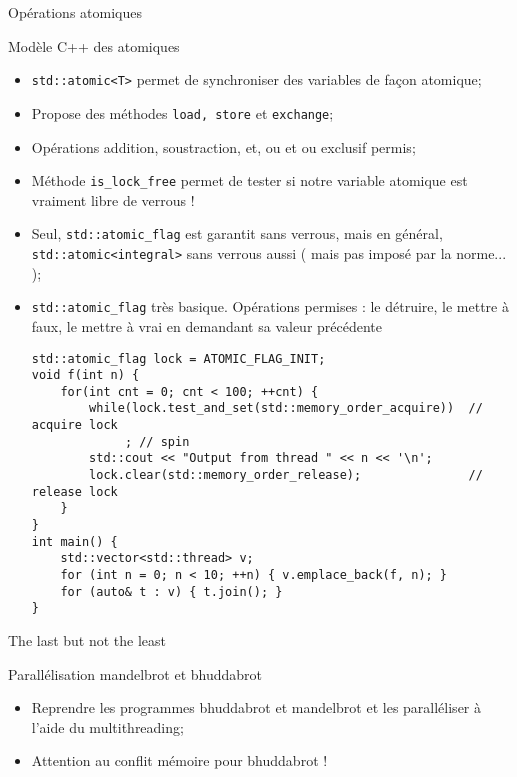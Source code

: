 \documentclass[handout,10pt]{beamer}
\begin{document}
\begin{frame}[fragile]{Opérations atomiques}
 \tiny
 \begin{block}{Modèle C++ des atomiques}
  \begin{itemize}
   \item \lstinline$std::atomic<T>$  permet de synchroniser des variables de façon atomique;
   \item Propose des méthodes \lstinline$load, store$ et \lstinline$exchange$;
   \item Opérations addition, soustraction, et, ou et ou exclusif permis;
   \item Méthode \lstinline$is_lock_free$ permet de tester si notre variable atomique est vraiment libre de verrous !
   \item Seul, \lstinline$std::atomic_flag$ est garantit sans verrous, mais en général, \lstinline$std::atomic<integral>$ sans verrous aussi ( mais pas imposé par la norme... );
   \item \lstinline$std::atomic_flag$ très basique. Opérations permises : le détruire, le mettre à faux, le mettre à vrai en demandant sa valeur précédente 
\begin{lstlisting}
std::atomic_flag lock = ATOMIC_FLAG_INIT; 
void f(int n) {
    for(int cnt = 0; cnt < 100; ++cnt) {
        while(lock.test_and_set(std::memory_order_acquire))  // acquire lock
             ; // spin
        std::cout << "Output from thread " << n << '\n';
        lock.clear(std::memory_order_release);               // release lock
    }
}
int main() {
    std::vector<std::thread> v;
    for (int n = 0; n < 10; ++n) { v.emplace_back(f, n); }
    for (auto& t : v) { t.join(); }
} \end{lstlisting}

  \end{itemize}
 \end{block}
\end{frame}

\begin{frame}[fragile]{The last but not the least}
\tiny
\begin{exampleblock}{Parallélisation mandelbrot et bhuddabrot}
\begin{itemize}
\item Reprendre les programmes bhuddabrot et mandelbrot et les paralléliser à l'aide du multithreading;
\item Attention au conflit mémoire pour bhuddabrot !
\end{itemize}

\end{exampleblock}
\end{frame}
\end{document}
